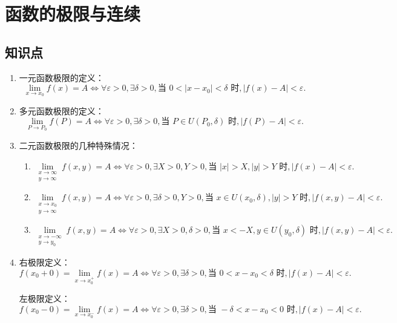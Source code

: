 \documentclass[UTF8]{ctexart}
\theoremstyle{remark}
\begin{document}
		
		\section{函数的极限与连续}
		
		\subsection*{知识点}
		
		\begin{enumerate}
			\item 一元函数极限的定义：
			$$
			\lim_{x \to x_0} f(x) = A \iff \forall \varepsilon > 0, \exists \delta > 0, \text{当 } 0 < |x - x_0| < \delta \text{ 时}, |f(x) - A| < \varepsilon.
			$$
			
			\item 多元函数极限的定义：
			$$
			\lim_{P \to P_0} f(P) = A \iff \forall \varepsilon > 0, \exists \delta > 0, \text{当 } P \in U(P_0, \delta) \text{ 时}, |f(P) - A| < \varepsilon.
			$$
			
			\item 二元函数极限的几种特殊情况：
			\begin{enumerate}
				\item
				$$
				\lim_{\substack{x \to \infty \\ y \to \infty}} f(x, y) = A \iff \forall \varepsilon > 0, \exists X > 0, Y > 0, \text{当 } |x| > X, |y| > Y \text{ 时}, |f(x) - A| < \varepsilon.
				$$
				\item
				$$
				\lim_{\substack{x \to x_0 \\ y \to \infty}} f(x, y) = A \iff \forall \varepsilon > 0, \exists \delta > 0, Y > 0, \text{当 } x \in U(x_0, \delta), |y| > Y \text{ 时}, |f(x, y) - A| < \varepsilon.
				$$
				\item
				$$
				\lim_{\substack{x \to -\infty \\ y \to y_0}} f(x, y) = A \iff \forall \varepsilon > 0, \exists X > 0, \delta > 0, \text{当 } x < -X, y \in U(y_0, \delta) \text{ 时}, |f(x, y) - A| < \varepsilon.
				$$
			\end{enumerate}
			
			\item 右极限定义：
			$$
			f(x_0 + 0) = \lim_{x \to x_0^+} f(x) = A \iff \forall \varepsilon > 0, \exists \delta > 0, \text{当 } 0 < x - x_0 < \delta \text{ 时}, |f(x) - A| < \varepsilon.
			$$
			
			左极限定义：
			$$
			f(x_0 - 0) = \lim_{x \to x_0^-} f(x) = A \iff \forall \varepsilon > 0, \exists \delta > 0, \text{当 } -\delta < x - x_0 < 0 \text{ 时}, |f(x) - A| < \varepsilon.
			$$
			

\end{enumerate}
\end{document}
